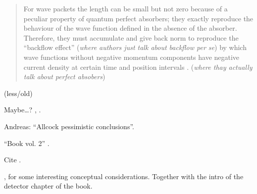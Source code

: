 \begin{quotation}
  For wave packets the length can be small but not zero because of a
  peculiar property of quantum perfect absorbers; they exactly reproduce
  the behaviour of the wave function defined in the absence of the absorber.
  Therefore, they must accumulate and give back norm to reproduce the
  ``backflow effect'' \parencite{Bracken_bf, Bracken_ProbTransport}
  (\emph{where authors just talk about backflow per se})
  by which wave functions without negative momentum components
  have negative current density at certain time and position intervals
  \parencite{Leavens_backflow}. (\emph{where thay actually talk about perfect absobers})
\end{quotation}

\cite{ComplexAbsPot}

\cite{Werner_ArrivalTime} (less/old)

Maybe\dots? \cite{ProbCurrent}, \cite{Ruschhaupt_QMoT}.

Andreas: ``Allcock pessimistic conclusions''.

``Book vol. 2'' \cite{TQM2:Detector}.

Cite \cite{Muga_ArrTimeOpNormal, Damborenea, Sudarshan_Zeno, Echanobe, Savvidou-1, Savvidou-2}.

\cite{Damborenea_atomic}, for some interesting conceptual considerations. Together with the
intro of the detector chapter of the book.